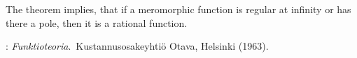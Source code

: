 \documentclass[12pt]{article}
\theoremstyle{definition}
\begin{document}
The theorem implies, that if a meromorphic function is regular at infinity or has there a pole, then it is a rational function.

\begin{thebibliography}{9}
: {\em Funktioteoria}.\, Kustannusosakeyhti\"o Otava, Helsinki (1963).
\end{thebibliography}

\end{document}
